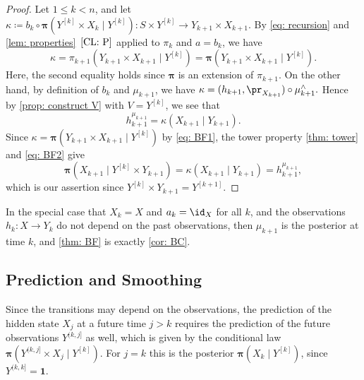\documentclass[12pt,reqno]{amsart}%
\theoremstyle{plain}
\theoremstyle{definition}
\def\bspi{\boldsymbol{\pi}}
\def\bsone{\boldsymbol{1}}
\begin{document}
\begin{proof}
	Let $1\leq k<n$, and let
	$\kappa\coloneqq b_k\circ\bspi(Y^{[k]}\times X_k\mid Y^{[k]})
	\colon S\times Y^{[k]}\rightarrow Y_{k+1}\times X_{k+1}$.
	By \eqref{eq: recursion} and \cref{lem: properties}~$\ref{CL: P}$ applied to $\pi_k$ and $a=b_k$, we have
	\begin{equation}\label{eq: BF1}
		\kappa=\pi_{k+1}(Y_{k+1}\times X_{k+1}\mid Y^{[k]})=\bspi(Y_{k+1}\times X_{k+1}\mid Y^{[k]}).
	\end{equation}
	Here, the second equality holds since $\bspi$ is an extension of $\pi_{k+1}$.
	On the other hand, by definition of $b_k$ and $\mu_{k+1}$, we have
	$
		\kappa=(h_{k+1},\pr_{X_{k+1}})\circ\mu_{k+1}^\wedge.
	$
	Hence by \cref{prop: construct V} with $V=Y^{[k]}$, we see that
	\begin{equation}\label{eq: BF2}
		h_{k+1}^{\mu_{k+1}}=\kappa(X_{k+1}\mid Y_{k+1}).
	\end{equation}
	Since $\kappa=\bspi(Y_{k+1}\times X_{k+1}\mid Y^{[k]})$ by \eqref{eq: BF1},
	the tower property \cref{thm: tower} and \eqref{eq: BF2} give
	\[
		\bspi(X_{k+1}\mid Y^{[k]}\times Y_{k+1})
		=\kappa(X_{k+1}\mid Y_{k+1})=h_{k+1}^{\mu_{k+1}},
	\]
	which is our assertion since $Y^{[k]}\times Y_{k+1}=Y^{[k+1]}$.
\end{proof}

In the special case that $X_k=X$ and $a_k=\id_X$ for all $k$, and the observations $h_k\colon X\rightarrow Y_k$ do not depend on the past observations,
then $\mu_{k+1}$ is the posterior at time $k$, and \cref{thm: BF}  is exactly \cref{cor: BC}.

%
\subsection{Prediction and Smoothing}
%


Since the transitions may depend on the observations,
the prediction of the hidden state $X_j$ at a future time $j>k$ requires the prediction of the
future observations $Y^{(k,j]}$ as well, which is given by the conditional law
$\bspi(Y^{(k,j]}\times X_j\mid Y^{[k]})$.
For $j=k$ this is the posterior $\bspi(X_k\mid Y^{[k]})$, since $Y^{(k,k]}=\bsone$.
\end{document}
